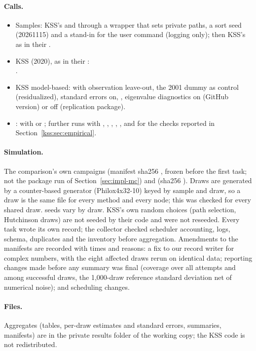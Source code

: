 \paragraph{Calls.}
\begin{itemize}
\item Samples: KSS's  and  through a wrapper that sets private paths, a sort seed
(20261115) and a stand-in for the user command  (logging only); then KSS's  as in
their .
\item KSS (2020), as in their :\\
{\footnotesize{}}.
\item KSS model-based:  with observation leave-out, the 2001 dummy as control
(residualized), standard errors on, , eigenvalue diagnostics on (GitHub version) or
off (replication package).
\item \fevc:  with
 or ; further runs with ,
, , , ,
 and  for the checks reported in Section~\ref{kss:sec:empirical}.
\end{itemize}

\paragraph{Simulation.} The comparison's own campaigns  (manifest sha256 , frozen
before the first task; not the package run  of Section~\ref{sec:impl-mc}) and  (sha256
). Draws are generated by a counter-based generator (Philox4x32-10)
keyed by sample and draw, so a draw is the same file for every method and every node; this was checked for every
shared draw. \fevc{} seeds vary by draw. KSS's own random choices (path selection, Hutchinson draws) are not
seeded by their code and were not reseeded. Every task wrote its own record; the collector checked scheduler
accounting, logs, schema, duplicates and the inventory before aggregation. Amendments to the manifests are
recorded with times and reasons: a fix to our record writer for complex numbers, with the eight affected draws
rerun on identical data; reporting changes made before any summary was final (coverage over all attempts and
among successful draws, the 1{,}000-draw reference standard deviation net of numerical noise); and scheduling
changes.

\paragraph{Files.} Aggregates (tables, per-draw estimates and standard errors, summaries, manifests) are in the
private results folder  of the \fevc{} working copy; the KSS code is
not redistributed.
